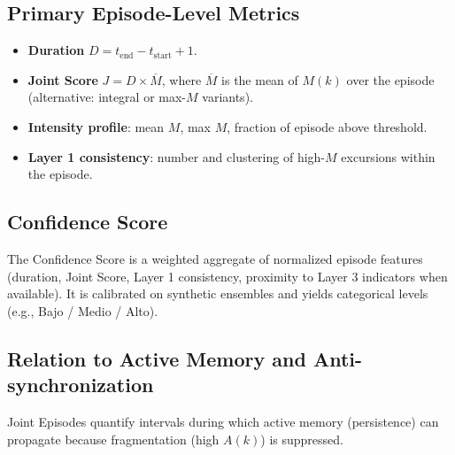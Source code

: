 \subsection{Primary Episode-Level Metrics}

\begin{itemize}
    \item \textbf{Duration} $D = t_\mathrm{end} - t_\mathrm{start} + 1$.
    \item \textbf{Joint Score} $J = D \times \overline{M}$, where $\overline{M}$ is the mean of $M(k)$ over the episode (alternative: integral or max-$M$ variants).
    \item \textbf{Intensity profile}: mean $M$, max $M$, fraction of episode above threshold.
    \item \textbf{Layer 1 consistency}: number and clustering of high-$M$ excursions within the episode.
\end{itemize}

\subsection{Confidence Score}

The Confidence Score is a weighted aggregate of normalized episode features (duration, Joint Score, Layer 1 consistency, proximity to Layer 3 indicators when available). It is calibrated on synthetic ensembles and yields categorical levels (e.g., Bajo / Medio / Alto).

\subsection{Relation to Active Memory and Anti-synchronization}

Joint Episodes quantify intervals during which active memory (persistence) can propagate because fragmentation (high $A(k)$) is suppressed.

